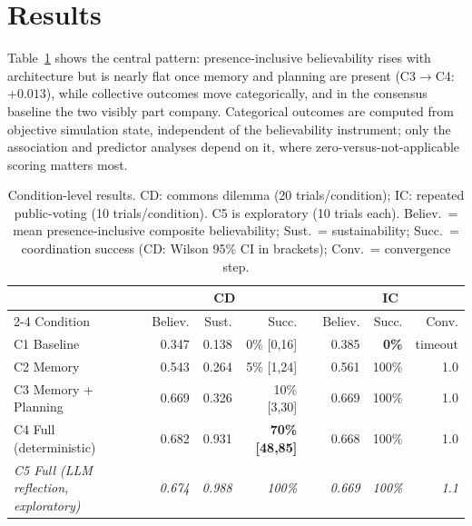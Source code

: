 \documentclass[runningheads]{llncs}
\begin{document}
\section{Results}\label{sec:results}
Table~\ref{tab:results} shows the central pattern: presence-inclusive believability rises with
architecture but is nearly flat once memory and planning are present (C3$\to$C4: $+0.013$), while
collective outcomes move categorically, and in the consensus baseline the two visibly part company.
Categorical outcomes are computed from objective simulation state, independent of the believability
instrument; only the association and predictor analyses depend on it, where
zero-versus-not-applicable scoring matters most.
\begin{table}[t]
\centering
\caption{Condition-level results. CD: commons dilemma (20 trials/condition); IC: repeated
public-voting (10 trials/condition). C5 is exploratory (10 trials each). Believ.\ = mean
presence-inclusive composite believability; Sust.\ = sustainability; Succ.\ = coordination
success (CD: Wilson 95\% CI in brackets); Conv.\ = convergence step.}
\label{tab:results}
\small
\setlength{\tabcolsep}{4pt}
\begin{tabular}{l rrr c rrr}
\toprule
 & \multicolumn{3}{c}{CD} & & \multicolumn{3}{c}{IC} \\
\cmidrule{2-4}\cmidrule{6-8}
Condition & Believ. & Sust. & Succ. & & Believ. & Succ. & Conv. \\
\midrule
C1 Baseline           & 0.347 & 0.138 & 0\% [0,16]   & & 0.385 & \textbf{0\%} & timeout \\
C2 Memory             & 0.543 & 0.264 & 5\% [1,24]   & & 0.561 & 100\% & 1.0 \\
C3 Memory + Planning  & 0.669 & 0.326 & 10\% [3,30]  & & 0.669 & 100\% & 1.0 \\
C4 Full (deterministic) & 0.682 & 0.931 & \textbf{70\% [48,85]} & & 0.668 & 100\% & 1.0 \\
\midrule
\emph{C5 Full (LLM reflection, exploratory)} & \emph{0.674} & \emph{0.988} & \emph{100\%} & & \emph{0.669} & \emph{100\%} & \emph{1.1} \\
\bottomrule
\end{tabular}
\end{table}
\end{document}
